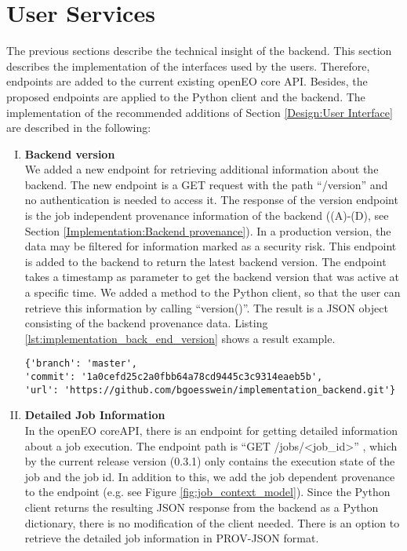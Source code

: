 \documentclass[draft,final]{vutinfth} %
\newcommand{\bgoesswein}[1]{{\color{blue}#1}}
\begin{document}
\section{User Services}\label{Implementation:User Interface}
The previous sections describe the technical insight of the backend. This section describes the implementation of the interfaces used by the users. Therefore, endpoints are added to the current existing openEO core API. Besides, the proposed endpoints are applied to the Python client and the backend. The implementation of the recommended additions of Section \ref{Design:User Interface} are described in the following:

\begin{enumerate}[I.]
\item \textbf{Backend version} \\
	We added a new endpoint for retrieving additional information about the backend. The new endpoint is a GET request with the path “/version” and no authentication is needed to access it. The response of the version endpoint is the job independent provenance information of the backend ((A)-(D), see Section \ref{Implementation:Backend provenance}). In a production version, the data may be filtered for information marked as a security risk. This endpoint is added to the backend to return the latest backend version. The endpoint takes a timestamp as parameter to get the backend version that was active at a specific time. We added a method to the Python client, so that the user can retrieve this information by calling “version()”. The result is a JSON object consisting of the backend provenance data. Listing \ref{lst:implementation_back_end_version} shows a result example.

\begin{listing}[ht]
	\begin{verbatim}
{'branch': 'master',
'commit': '1a0cefd25c2a0fbb64a78cd9445c3c9314eaeb5b',
'url': 'https://github.com/bgoesswein/implementation_backend.git'}
	\end{verbatim}
	\caption{Backend version example.}
	\label{lst:implementation_back_end_version}
\end{listing}

\item \textbf{Detailed Job Information} \\
	In the openEO coreAPI, there is an endpoint for getting detailed information about a job execution. The endpoint path is “GET /jobs/<job\_id>” , which by the current release version (0.3.1) only contains the execution state of the job and the job id. In addition to this, we add the job dependent provenance to the endpoint (e.g. see Figure \ref{fig:job_context_model}). Since the Python client returns the resulting JSON response from the backend as a Python dictionary, there is no modification of the client needed. \bgoesswein{There is an option to retrieve the detailed job information in PROV-JSON format.}


\end{enumerate}
\end{document}
